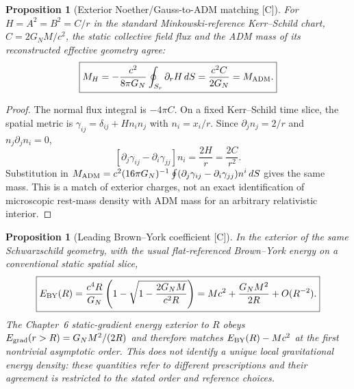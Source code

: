 \documentclass[11pt,a4paper]{article}
\newtheorem{proposition}[theorem]{Proposition}
\theoremstyle{definition}\newtheorem{definition}[theorem]{Definition}
\theoremstyle{remark}\newtheorem{remark}[theorem]{Remark}
\newcommand{\Ctag}{\textsf{[C]}}
\begin{document}
\begin{proposition}[Exterior Noether/Gauss-to-ADM matching \Ctag]
\label{prop:v14-adm}
For $H=A^2=B^2=C/r$ in the standard Minkowski-reference
Kerr--Schild chart, $C=2G_NM/c^2$, the static collective field
flux and the ADM mass of its reconstructed effective geometry agree:
\begin{equation}\label{eq:v14-adm}
\boxed{M_H=-\frac{c^2}{8\pi G_N}\oint_{S_r}\partial_rH\,dS
=\frac{c^2 C}{2G_N}=M_{\rm ADM}.}
\end{equation}
\end{proposition}
\begin{proof}
The normal flux integral is $-4\pi C$.
On a fixed Kerr--Schild time slice, the spatial metric is
$\gamma_{ij}=\delta_{ij}+Hn_in_j$ with $n_i=x_i/r$.
Since $\partial_j n_j=2/r$ and $n_j\partial_jn_i=0$,
\begin{equation}\label{eq:v14-admint}
[\partial_j\gamma_{ij}-\partial_i\gamma_{jj}]n_i
=\frac{2H}{r}=\frac{2C}{r^2}.
\end{equation}
Substitution in
$M_{\rm ADM}=c^2(16\pi G_N)^{-1}\oint
(\partial_j\gamma_{ij}-\partial_i\gamma_{jj})n^i\,dS$
gives the same mass. This is a match of exterior charges, not
an exact identification of microscopic rest-mass density with ADM
mass for an arbitrary relativistic interior.
\end{proof}

\begin{proposition}[Leading Brown--York coefficient \Ctag]
\label{prop:v14-by}
In the exterior of the same Schwarzschild geometry, with the
usual flat-referenced Brown--York energy on a conventional static
spatial slice,
\begin{equation}\label{eq:v14-by}
\boxed{E_{\rm BY}(R)
=\frac{c^4R}{G_N}\left(1-\sqrt{1-\frac{2G_NM}{c^2R}}\right)
=Mc^2+\frac{G_NM^2}{2R}+O(R^{-2}).}
\end{equation}
The Chapter~6 static-gradient energy exterior to $R$ obeys
$E_{\rm grad}(r>R)=G_NM^2/(2R)$ and therefore matches
$E_{\rm BY}(R)-Mc^2$ at the first nontrivial asymptotic order.
This does not identify a unique local gravitational energy density:
these quantities refer to different prescriptions and their agreement
is restricted to the stated order and reference choices.
\end{proposition}
\end{document}
